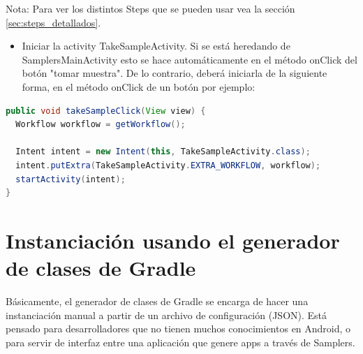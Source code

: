 Nota: Para ver los distintos Steps que se pueden usar vea la sección \ref{sec:steps_detallados}.

\begin{itemize}
	\item Iniciar la activity TakeSampleActivity. Si se está heredando de SamplersMainActivity esto se hace automáticamente en el método onClick del botón "tomar muestra". De lo contrario, deberá iniciarla de la siguiente forma, en el método onClick de un botón por ejemplo:
\end{itemize}

\begin{lstlisting}[language=Java, frame=tlbr, caption=Ejemplo de como iniciar la activity TakeSampleActivity.]
public void takeSampleClick(View view) {
  Workflow workflow = getWorkflow();

  Intent intent = new Intent(this, TakeSampleActivity.class);        
  intent.putExtra(TakeSampleActivity.EXTRA_WORKFLOW, workflow);
  startActivity(intent);
}		
\end{lstlisting}




\section{Instanciación usando el  generador de clases de Gradle}

Básicamente, el generador de clases de Gradle se encarga de hacer una instanciación manual a partir de un archivo de configuración (JSON). Está pensado para desarrolladores que no tienen muchos conocimientos en Android, o para servir de interfaz entre una aplicación que genere apps a través de Samplers.

